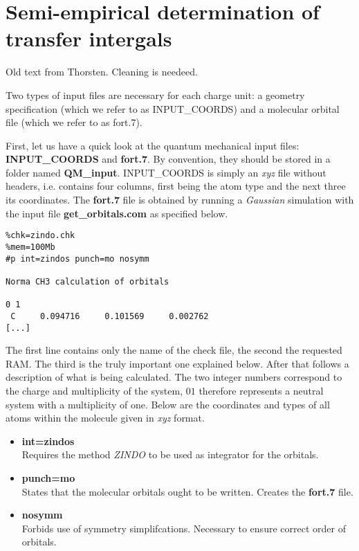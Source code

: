 \section{Semi-empirical determination of transfer intergals}
\label{sec:moo}

{\color{red} Old text from Thorsten. Cleaning is needeed.}

Two types of input files are necessary for each charge unit: a geometry specification (which we refer to as INPUT\_COORDS) and a molecular orbital file (which we refer to as fort.7).

First, let us have a quick look at the quantum mechanical input files: {\bf INPUT\_COORDS} and {\bf fort.7}. By convention, they should be stored in a folder named {\bf QM\_input}. INPUT\_COORDS is simply an \emph{xyz} file without headers, i.e. contains four columns, first being the atom type and the next three its coordinates. The {\bf fort.7} file is obtained by running a \emph{Gaussian} simulation with the input file {\bf get\_orbitals.com} as specified below.

\begin{verbatim}
%chk=zindo.chk
%mem=100Mb
#p int=zindos punch=mo nosymm

Norma CH3 calculation of orbitals

0 1
 C     0.094716     0.101569     0.002762
[...]
\end{verbatim}

The first line contains only the name of the check file,
the second the requested RAM. The third is the truly important
one explained below. After that follows a description of what
is being calculated. The two integer numbers correspond to the
charge and multiplicity of the system, $0 1$ therefore represents
a neutral system with a multiplicity of one. Below are the coordinates
and types of all atoms within the molecule given in \emph{xyz} format.

\begin{itemize}
 \item {\bf int=zindos} \\
        Requires the method \emph{ZINDO} to be used as integrator for the orbitals.
 \item {\bf punch=mo} \\
        States that the molecular orbitals ought to be written. Creates the {\bf fort.7} file.
 \item {\bf nosymm} \\
        Forbids use of symmetry simplifcations. Necessary to ensure correct order of orbitals.
\end{itemize}

